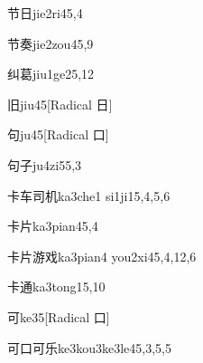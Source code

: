 \begin{verbete}{节日}{jie2ri4}{5,4}
\end{verbete}

\begin{verbete}{节奏}{jie2zou4}{5,9}
\end{verbete}

\begin{verbete}{纠葛}{jiu1ge2}{5,12}
\end{verbete}

\begin{verbete}{旧}{jiu4}{5}[Radical 日]
\end{verbete}

\begin{verbete}{句}{ju4}{5}[Radical 口]
\end{verbete}

\begin{verbete}{句子}{ju4zi5}{5,3}
\end{verbete}

\begin{verbete}{卡车司机}{ka3che1 si1ji1}{5,4,5,6}
\end{verbete}

\begin{verbete}{卡片}{ka3pian4}{5,4}
\end{verbete}

\begin{verbete}{卡片游戏}{ka3pian4 you2xi4}{5,4,12,6}
\end{verbete}

\begin{verbete}{卡通}{ka3tong1}{5,10}
\end{verbete}

\begin{verbete}{可}{ke3}{5}[Radical 口]
\end{verbete}

\begin{verbete}{可口可乐}{ke3kou3ke3le4}{5,3,5,5}
\end{verbete}

